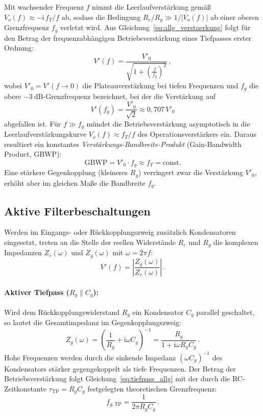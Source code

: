 \documentclass[12pt,a4paper,titlepage]{scrartcl}
\numberwithin{equation}{section}
\numberwithin{table}{section}
\numberwithin{figure}{section}
\begin{document}
Mit wachsender Frequenz $f$ nimmt die Leerlaufverstärkung gemäß $V_o(f) \approx -\mathrm{i}\, f_T / f$ ab, sodass die Bedingung $R_e / R_g \gg 1/|V_o(f)|$ ab einer oberen Grenzfrequenz $f_g$ verletzt wird. Aus Gleichung~\eqref{eq:allg_verstaerkung} folgt für den Betrag der frequenzabhängigen Betriebsverstärkung eines Tiefpasses erster Ordnung:
\begin{equation}
    V'(f) = \frac{V'_0}{\sqrt{1 + \left(\frac{f}{f_g}\right)^2}} \,,
    \label{eq:tiefpass_allg}
\end{equation}
wobei $V'_0 = V'(f \to 0)$ die Plateauverstärkung bei tiefen Frequenzen und $f_g$ die obere $\SI{-3}{\deci\bel}$-Grenzfrequenz bezeichnet, bei der die Verstärkung auf
\begin{equation}
    V'(f_g) = \frac{V'_0}{\sqrt{2}} \approx 0{,}707\, V'_0
\end{equation}
abgefallen ist. Für $f \gg f_g$ mündet die Betriebsverstärkung asymptotisch in die Leerlaufverstärkungskurve $V_o(f) \approx f_T / f$ des Operationsverstärkers ein. Daraus resultiert ein konstantes \emph{Verstärkungs-Bandbreite-Produkt} (Gain-Bandwidth Product, GBWP):
\begin{equation}
    \text{GBWP} = V'_0 \cdot f_g \approx f_T = \text{const.}
    \label{eq:gbwp}
\end{equation}
Eine stärkere Gegenkopplung (kleineres $R_g$) verringert zwar die Verstärkung $V'_0$, erhöht aber im gleichen Maße die Bandbreite $f_g$.

\subsection{Aktive Filterbeschaltungen}

Werden im Eingangs- oder Rückkopplungszweig zusätzlich Kondensatoren eingesetzt, treten an die Stelle der reellen Widerstände $R_e$ und $R_g$ die komplexen Impedanzen $Z_e(\omega)$ und $Z_g(\omega)$ mit $\omega = 2\pi f$:
\begin{equation}
    V'(f) = \left|\frac{Z_g(\omega)}{Z_e(\omega)}\right| \,.
\end{equation}

\paragraph{Aktiver Tiefpass ($R_g \parallel C_g$):}
Wird dem Rückkopplungswiderstand $R_g$ ein Kondensator $C_g$ parallel geschaltet, so lautet die Gesamtimpedanz im Gegenkopplungszweig:
\begin{equation}
    Z_g(\omega) = \left(\frac{1}{R_g} + \mathrm{i}\omega C_g\right)^{-1} = \frac{R_g}{1 + \mathrm{i}\omega R_g C_g} \,.
\end{equation}
Hohe Frequenzen werden durch die sinkende Impedanz $(\omega C_g)^{-1}$ des Kondensators stärker gegengekoppelt als tiefe Frequenzen. Der Betrag der Betriebsverstärkung folgt Gleichung~\eqref{eq:tiefpass_allg} mit der durch die RC-Zeitkonstante $\tau_{\text{TP}} = R_g C_g$ festgelegten theoretischen Grenzfrequenz:
\begin{equation}
    f_{g,\text{TP}} = \frac{1}{2\pi R_g C_g} \,.
    \label{eq:fg_tp}
\end{equation}
\end{document}
